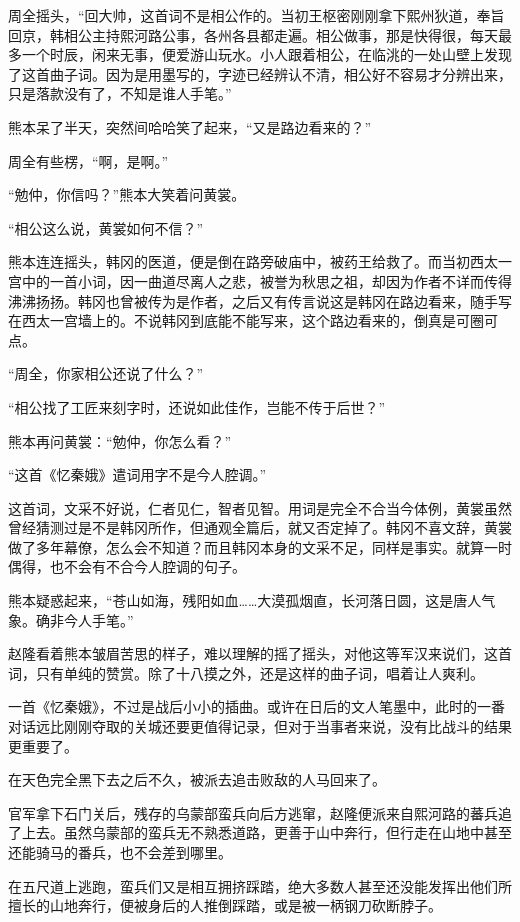 周全摇头，“回大帅，这首词不是相公作的。当初王枢密刚刚拿下熙州狄道，奉旨回京，韩相公主持熙河路公事，各州各县都走遍。相公做事，那是快得很，每天最多一个时辰，闲来无事，便爱游山玩水。小人跟着相公，在临洮的一处山壁上发现了这首曲子词。因为是用墨写的，字迹已经辨认不清，相公好不容易才分辨出来，只是落款没有了，不知是谁人手笔。”

熊本呆了半天，突然间哈哈笑了起来，“又是路边看来的？”

周全有些楞，“啊，是啊。”

“勉仲，你信吗？”熊本大笑着问黄裳。

“相公这么说，黄裳如何不信？”

熊本连连摇头，韩冈的医道，便是倒在路旁破庙中，被药王给救了。而当初西太一宫中的一首小词，因一曲道尽离人之悲，被誉为秋思之祖，却因为作者不详而传得沸沸扬扬。韩冈也曾被传为是作者，之后又有传言说这是韩冈在路边看来，随手写在西太一宫墙上的。不说韩冈到底能不能写来，这个路边看来的，倒真是可圈可点。

“周全，你家相公还说了什么？”

“相公找了工匠来刻字时，还说如此佳作，岂能不传于后世？”

熊本再问黄裳：“勉仲，你怎么看？”

“这首《忆秦娥》遣词用字不是今人腔调。”

这首词，文采不好说，仁者见仁，智者见智。用词是完全不合当今体例，黄裳虽然曾经猜测过是不是韩冈所作，但通观全篇后，就又否定掉了。韩冈不喜文辞，黄裳做了多年幕僚，怎么会不知道？而且韩冈本身的文采不足，同样是事实。就算一时偶得，也不会有不合今人腔调的句子。

熊本疑惑起来，“苍山如海，残阳如血……大漠孤烟直，长河落日圆，这是唐人气象。确非今人手笔。”

赵隆看着熊本皱眉苦思的样子，难以理解的摇了摇头，对他这等军汉来说们，这首词，只有单纯的赞赏。除了十八摸之外，还是这样的曲子词，唱着让人爽利。

一首《忆秦娥》，不过是战后小小的插曲。或许在日后的文人笔墨中，此时的一番对话远比刚刚夺取的关城还要更值得记录，但对于当事者来说，没有比战斗的结果更重要了。

在天色完全黑下去之后不久，被派去追击败敌的人马回来了。

官军拿下石门关后，残存的乌蒙部蛮兵向后方逃窜，赵隆便派来自熙河路的蕃兵追了上去。虽然乌蒙部的蛮兵无不熟悉道路，更善于山中奔行，但行走在山地中甚至还能骑马的番兵，也不会差到哪里。

在五尺道上逃跑，蛮兵们又是相互拥挤踩踏，绝大多数人甚至还没能发挥出他们所擅长的山地奔行，便被身后的人推倒踩踏，或是被一柄钢刀砍断脖子。

